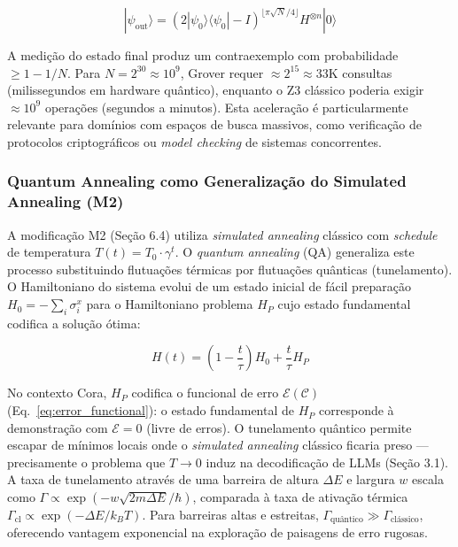 \documentclass[5p]{elsarticle}
\theoremstyle{remark}
\begin{document}
\begin{equation}
|\psi_{\text{out}}\rangle = (2|\psi_0\rangle\langle\psi_0| - I)^{\lfloor \pi\sqrt{N}/4 \rfloor} H^{\otimes n} |0\rangle
\label{eq:grover_cora}
\end{equation}

A medição do estado final produz um contraexemplo com probabilidade $\geq 1 - 1/N$. Para $N = 2^{30} \approx 10^9$, Grover requer $\approx 2^{15} \approx 33\text{K}$ consultas (milissegundos em hardware quântico), enquanto o Z3 clássico poderia exigir $\approx 10^9$ operações (segundos a minutos). Esta aceleração é particularmente relevante para domínios com espaços de busca massivos, como verificação de protocolos criptográficos ou \textit{model checking} de sistemas concorrentes.

\subsubsection{Quantum Annealing como Generalização do Simulated Annealing (M2)}

A modificação M2 (Seção 6.4) utiliza \textit{simulated annealing} clássico com \textit{schedule} de temperatura $T(t) = T_0 \cdot \gamma^t$. O \textit{quantum annealing} (QA) \cite{Kadowaki1998Quantum, Farhi2001Quantum} generaliza este processo substituindo flutuações térmicas por flutuações quânticas (tunelamento). O Hamiltoniano do sistema evolui de um estado inicial de fácil preparação $H_0 = -\sum_i \sigma_i^x$ para o Hamiltoniano problema $H_P$ cujo estado fundamental codifica a solução ótima:

\begin{equation}
H(t) = \left(1 - \frac{t}{\tau}\right) H_0 + \frac{t}{\tau} H_P
\label{eq:quantum_annealing}
\end{equation}

No contexto Cora, $H_P$ codifica o funcional de erro $\mathcal{E}(\mathcal{C})$ (Eq.~\ref{eq:error_functional}): o estado fundamental de $H_P$ corresponde à demonstração com $\mathcal{E} = 0$ (livre de erros). O tunelamento quântico permite escapar de mínimos locais onde o \textit{simulated annealing} clássico ficaria preso — precisamente o problema que $T \to 0$ induz na decodificação de LLMs (Seção 3.1). A taxa de tunelamento através de uma barreira de altura $\Delta E$ e largura $w$ escala como $\Gamma \propto \exp(-w\sqrt{2m\Delta E}/\hbar)$, comparada à taxa de ativação térmica $\Gamma_{\text{cl}} \propto \exp(-\Delta E/k_BT)$. Para barreiras altas e estreitas, $\Gamma_{\text{quântico}} \gg \Gamma_{\text{clássico}}$, oferecendo vantagem exponencial na exploração de paisagens de erro rugosas.
\end{document}
